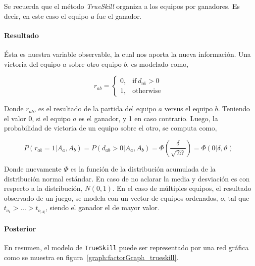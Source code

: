 \documentclass[11pt,twoside,spanish]{report} %
\begin{document}
Se recuerda que el m\'etodo \textit{TrueSkill} organiza a los equipos por ganadores.
Es decir, en este caso el equipo $a$ fue el ganador.


\paragraph{Resultado}

\'Esta es nuestra variable observable, la cual nos aporta la nueva informaci\'on.
Una victoria del equipo $ a $ sobre otro equipo $ b $, es modelado como,

\begin{equation}
	r_{ab} =
	\begin{cases}
		0, & \text{if}\ d_{ab} > 0 \\
		1, & \text{otherwise}
	\end{cases}
\end{equation}

Donde $r_{ab}$, es el resultado de la partida del equipo $a$ versus el equipo $b$.
Teniendo el valor 0, si el equipo $a$ es el ganador, y 1 en caso contrario.
Luego, la probabilidad de victoria de un equipo sobre el otro, se computa como,


\begin{equation} \label{eq:proba_win}
P(r_{ab}=1|A_a,A_b) = P(d_{ab} > 0 | A_a,A_b) = \Phi\left( \frac{\delta}{\sqrt{2\vartheta} } \right)= \Phi\left( 0| \delta, \vartheta \right)
\end{equation}

Donde nuevamente $\Phi$ es la funci\'on de la distribuci\'on acumulada de la distribuci\'on normal est\'andar.
En caso de no aclarar la media y desviaci\'on es con respecto a la distribuci\'on, $N(0, 1)$.
En el caso de m\'ultiples equipos, el resultado observado de un juego, se modela con un vector de equipos ordenados, $o$, tal que $t_{o_1}> \dots > t_{o_{|A|}}$, siendo el ganador el de mayor valor.

\paragraph{Posterior} En resumen, el modelo de \texttt{TrueSkill} puede ser representado por una red gr\'afica como se muestra en figura~\ref{graph:factorGraph_trueskill}.
\end{document}
